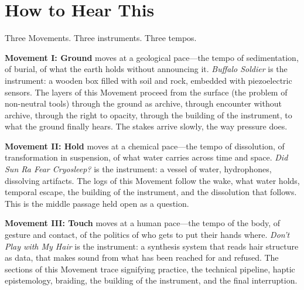
\section*{How to Hear This}

Three Movements. Three instruments. Three tempos.

\textbf{Movement I: Ground} moves at a geological pace---the tempo of sedimentation, of burial, of what the earth holds without announcing it. \textit{Buffalo Soldier} is the instrument: a wooden box filled with soil and rock, embedded with piezoelectric sensors. The layers of this Movement proceed from the surface (the problem of non-neutral tools) through the ground as archive, through encounter without archive, through the right to opacity, through the building of the instrument, to what the ground finally hears. The stakes arrive slowly, the way pressure does.

\textbf{Movement II: Hold} moves at a chemical pace---the tempo of dissolution, of transformation in suspension, of what water carries across time and space. \textit{Did Sun Ra Fear Cryosleep?} is the instrument: a vessel of water, hydrophones, dissolving artifacts. The logs of this Movement follow the wake, what water holds, temporal escape, the building of the instrument, and the dissolution that follows. This is the middle passage held open as a question.

\textbf{Movement III: Touch} moves at a human pace---the tempo of the body, of gesture and contact, of the politics of who gets to put their hands where. \textit{Don't Play with My Hair} is the instrument: a synthesis system that reads hair structure as data, that makes sound from what has been reached for and refused. The sections of this Movement trace signifying practice, the technical pipeline, haptic epistemology, braiding, the building of the instrument, and the final interruption.

